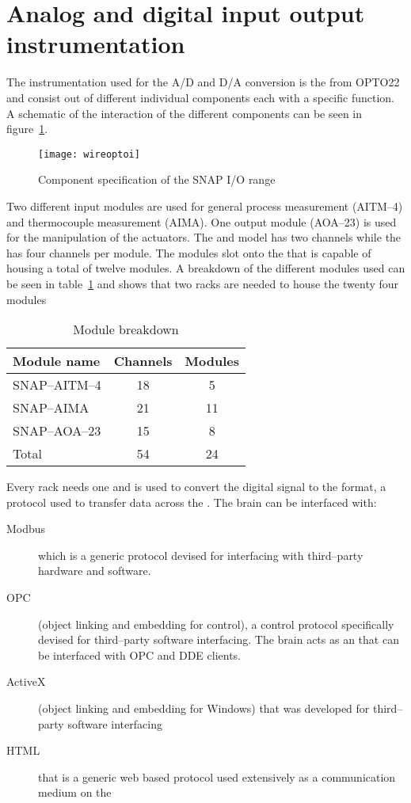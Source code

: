\section{Analog and digital input output instrumentation}    
The instrumentation used for the A/D and D/A conversion is the  from OPTO22 and consist out of different individual components each with a specific function. A schematic of the interaction of the different components can be seen in figure~\ref{fig:wire:optoi}. 
\begin{figure}[htbp]
	\centering
	\texttt{[image: wireoptoi]}
	\caption{Component specification of the SNAP I/O range}
	\label{fig:wire:optoi}
\end{figure}
Two different input modules are used for general process measurement (AITM--4) and thermocouple measurement (AIMA). One output module (AOA--23) is used for the manipulation of the actuators. The  and  model has two channels while the  has four channels per module. The modules slot onto the  that is capable of housing a total of twelve modules. A breakdown of the different modules used can be seen in table~\ref{tab:wire:node} and shows that two racks are needed to house the twenty four modules
\begin{table}[htbp]
	\centering
	\caption{Module breakdown}
	\begin{tabular}{l c c}
	\toprule[1pt]
		Module name    &Channels&Modules \\
	\midrule[0.5pt] 
	  SNAP--AITM--4  &  18    &  5 \\ 
	  SNAP--AIMA     &  21		&  11\\
	  SNAP--AOA--23	 &  15    &  8 \\
	 \midrule[0.5pt]
	  Total          &  54    &  24\\
	 \bottomrule[1pt]
	\end{tabular}
	\label{tab:wire:node}
\end{table}

Every rack needs one  and is used to convert the digital signal to the  format, a protocol used to transfer data across the . The brain can be interfaced with:
\begin{description}
	\item [Modbus] which is a generic protocol devised for interfacing with third--party hardware and software.  
	\item [OPC] (object linking and embedding for control), a control protocol specifically devised for third--party software interfacing. The brain acts as an  that can be interfaced with OPC and DDE clients.    
	\item [ActiveX] (object linking and embedding for Windows) that was developed for third--party software interfacing 
	\item [HTML] that is a generic web based protocol used extensively as a communication medium on the   
\end{description}

